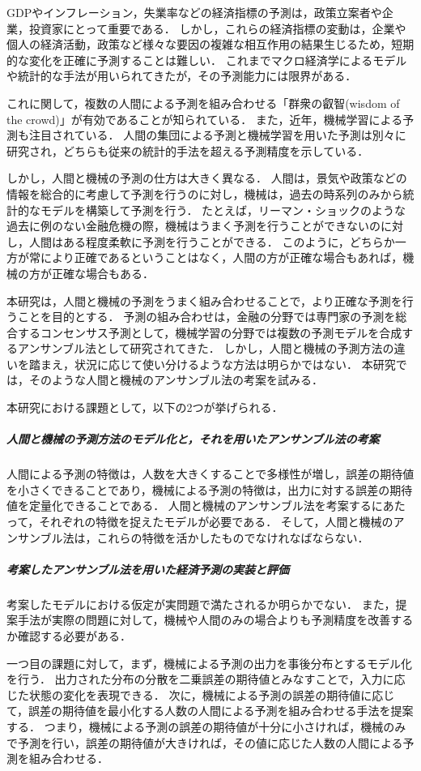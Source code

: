 \documentclass[../main.tex]{subfiles}
\begin{document}
\begin{jabstract}
GDPやインフレーション，失業率などの経済指標の予測は，政策立案者や企業，投資家にとって重要である．
しかし，これらの経済指標の変動は，企業や個人の経済活動，政策など様々な要因の複雑な相互作用の結果生じるため，短期的な変化を正確に予測することは難しい．
これまでマクロ経済学によるモデルや統計的な手法が用いられてきたが，その予測能力には限界がある．

これに関して，複数の人間による予測を組み合わせる「群衆の叡智(wisdom of the crowd)」が有効であることが知られている．
また，近年，機械学習による予測も注目されている．
人間の集団による予測と機械学習を用いた予測は別々に研究され，どちらも従来の統計的手法を超える予測精度を示している．

しかし，人間と機械の予測の仕方は大きく異なる．
人間は，景気や政策などの情報を総合的に考慮して予測を行うのに対し，機械は，過去の時系列のみから統計的なモデルを構築して予測を行う．
たとえば，リーマン・ショックのような過去に例のない金融危機の際，機械はうまく予測を行うことができないのに対し，人間はある程度柔軟に予測を行うことができる．
このように，どちらか一方が常により正確であるということはなく，人間の方が正確な場合もあれば，機械の方が正確な場合もある．

本研究は，人間と機械の予測をうまく組み合わせることで，より正確な予測を行うことを目的とする．
予測の組み合わせは，金融の分野では専門家の予測を総合するコンセンサス予測として，機械学習の分野では複数の予測モデルを合成するアンサンブル法として研究されてきた．
しかし，人間と機械の予測方法の違いを踏まえ，状況に応じて使い分けるような方法は明らかではない．
本研究では，そのような人間と機械のアンサンブル法の考案を試みる．

本研究における課題として，以下の2つが挙げられる．

\subparagraph{人間と機械の予測方法のモデル化と，それを用いたアンサンブル法の考案}
人間による予測の特徴は，人数を大きくすることで多様性が増し，誤差の期待値を小さくできることであり，機械による予測の特徴は，出力に対する誤差の期待値を定量化できることである．
人間と機械のアンサンブル法を考案するにあたって，それぞれの特徴を捉えたモデルが必要である．
そして，人間と機械のアンサンブル法は，これらの特徴を活かしたものでなけれなばならない．

\subparagraph{考案したアンサンブル法を用いた経済予測の実装と評価}
考案したモデルにおける仮定が実問題で満たされるか明らかでない．
また，提案手法が実際の問題に対して，機械や人間のみの場合よりも予測精度を改善するか確認する必要がある．

一つ目の課題に対して，まず，機械による予測の出力を事後分布とするモデル化を行う．
出力された分布の分散を二乗誤差の期待値とみなすことで，入力に応じた状態の変化を表現できる．
次に，機械による予測の誤差の期待値に応じて，誤差の期待値を最小化する人数の人間による予測を組み合わせる手法を提案する．
つまり，機械による予測の誤差の期待値が十分に小さければ，機械のみで予測を行い，誤差の期待値が大きければ，その値に応じた人数の人間による予測を組み合わせる．


\end{jabstract}
\end{document}
